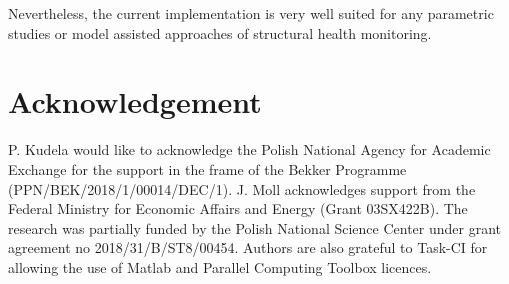 \documentclass[preprint,12pt]{elsarticle}
\begin{document}
	Nevertheless, the current implementation is very well suited for any parametric studies or model assisted approaches of structural health monitoring.
	 
	\section*{Acknowledgement}
	P. Kudela would like to acknowledge the Polish National Agency for Academic Exchange for the support in the frame of the Bekker Programme (PPN/BEK/2018/1/00014/DEC/1). J. Moll acknowledges support from the Federal Ministry for
	Economic Affairs and Energy (Grant 03SX422B). The research was partially funded by the Polish National Science Center under grant agreement no 2018/31/B/ST8/00454. Authors are also grateful to Task-CI for allowing the use of Matlab and Parallel Computing Toolbox licences. 
	
	
	
	
    
	{}
\end{document}
